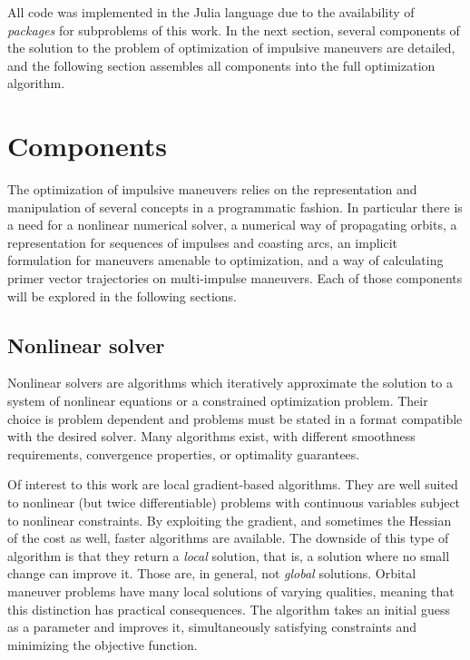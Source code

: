 
All code was implemented in the Julia language due to the availability of \textit{packages} for subproblems of this work. In the next section, several components of the solution to the problem of optimization of impulsive maneuvers are detailed, and the following section assembles all components into the full optimization algorithm.

\section{Components}

The optimization of impulsive maneuvers relies on the representation and manipulation of several concepts in a programmatic fashion. In particular there is a need for a nonlinear numerical solver, a numerical way of propagating orbits, a representation for sequences of impulses and coasting arcs, an implicit formulation for maneuvers amenable to optimization, and a way of calculating primer vector trajectories on multi-impulse maneuvers. Each of those components will be explored in the following sections.

\subsection{Nonlinear solver}\label{sssec:solver}

Nonlinear solvers are algorithms which iteratively approximate the solution to a system of nonlinear equations or a constrained optimization problem. Their choice is problem dependent and problems must be stated in a format compatible with the desired solver. Many algorithms exist, with different smoothness requirements, convergence properties, or optimality guarantees. 

Of interest to this work are local gradient-based algorithms. They are well suited to nonlinear (but twice differentiable) problems with continuous variables subject to nonlinear constraints. By exploiting the gradient, and sometimes the Hessian of the cost as well, faster algorithms are available. The downside of this type of algorithm is that they return a \textit{local} solution, that is, a solution where no small change can improve it. Those are, in general, not \textit{global} solutions. Orbital maneuver problems have many local solutions of varying qualities, meaning that this distinction has practical consequences. The algorithm takes an initial guess as a parameter and improves it, simultaneously satisfying constraints and minimizing the objective function.

